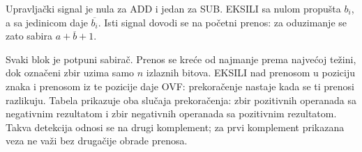 Upravljački signal je nula za ADD i jedan za SUB. EKSILI sa nulom propušta $b_i$, a sa jedinicom daje $\overline{b_i}$. Isti signal dovodi se na početni prenos: za oduzimanje se zato sabira $a+\overline b+1$.

Svaki blok je potpuni sabirač. Prenos se kreće od najmanje prema najvećoj težini, dok označeni zbir uzima samo $n$ izlaznih bitova. EKSILI nad prenosom u poziciju znaka i prenosom iz te pozicije daje OVF: prekoračenje nastaje kada se ti prenosi razlikuju. Tabela prikazuje oba slučaja prekoračenja: zbir pozitivnih operanada sa negativnim rezultatom i zbir negativnih operanada sa pozitivnim rezultatom. Takva detekcija odnosi se na drugi komplement; za prvi komplement prikazana veza ne važi bez drugačije obrade prenosa.
